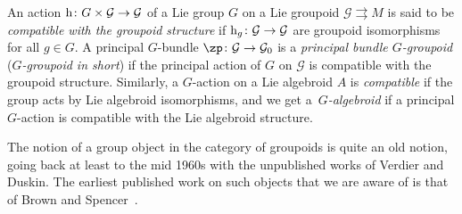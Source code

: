 \documentclass[10pt,a4paper]{amsart}
\newcommand{\rmh}{\textnormal{h}}
\newcommand{\ti}{\times}
\def\cG{\mathcal{G}}
\numberwithin{equation}{section}
\begin{document}
\begin{Definition}\label{d1} An action $\rmh\colon G\ti\cG\to\cG$ of a Lie group $G$ on a Lie groupoid $\cG\rightrightarrows M$ is said to be \emph{compatible with the groupoid structure} if $\rmh_g\colon \cG\to\cG$ are groupoid isomorphisms for all $g\in G$. A principal $G$-bundle $\zp\colon \cG\to\cG_0$ is a \emph{principal bundle $G$-groupoid} (\emph{$G$-groupoid in short}) if the principal action of $G$ on $\cG$ is compatible with the groupoid structure. Similarly, a $G$-action on a Lie algebroid $A$ is \emph{compatible} if the group acts by Lie algebroid isomorphisms, and we get a~\emph{$G$-algebroid} if a principal $G$-action is compatible with the Lie algebroid structure.
\end{Definition}

\begin{Remark}The notion of a group object in the category of groupoids is quite an old notion, going back at least to the mid 1960s with the unpublished works of Verdier and Duskin. The earliest published work on such objects that we are aware of is that of Brown and Spencer~\cite{Brown:1976}.
\end{Remark}
\end{document}
